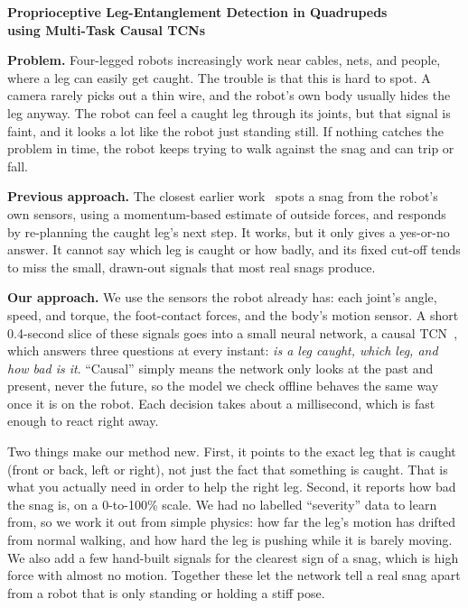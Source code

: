 \documentclass[11pt]{article}
\begin{document}
\begin{center}
  {\Large\bfseries Proprioceptive Leg-Entanglement Detection in Quadrupeds\\[2pt]
   using Multi-Task Causal TCNs}
\end{center}

\vspace{4pt}

\noindent\textbf{Problem.} Four-legged robots increasingly work near cables, nets, and people, where a
leg can easily get caught. The trouble is that this is hard to spot. A camera rarely picks out a thin
wire, and the robot's own body usually hides the leg anyway. The robot can feel a caught leg through
its joints, but that signal is faint, and it looks a lot like the robot just standing still. If nothing
catches the problem in time, the robot keeps trying to walk against the snag and can trip or fall.

\noindent\textbf{Previous approach.} The closest earlier work~\cite{yim2023} spots a snag from the
robot's own sensors, using a momentum-based estimate of outside forces, and responds by re-planning the
caught leg's next step. It works, but it only gives a yes-or-no answer. It cannot say which leg is
caught or how badly, and its fixed cut-off tends to miss the small, drawn-out signals that most real
snags produce.

\noindent\textbf{Our approach.} We use the sensors the robot already has: each joint's angle, speed,
and torque, the foot-contact forces, and the body's motion sensor. A short 0.4-second slice of these
signals goes into a small neural network, a causal TCN~\cite{bai2018,oord2016}, which answers three
questions at every instant: \emph{is a leg caught, which leg, and how bad is it}. ``Causal'' simply
means the network only looks at the past and present, never the future, so the model we check offline
behaves the same way once it is on the robot. Each decision takes about a millisecond, which is fast
enough to react right away.

Two things make our method new. First, it points to the exact leg that is caught (front or back, left
or right), not just the fact that something is caught. That is what you actually need in order to help
the right leg. Second, it reports how bad the snag is, on a 0-to-100\% scale. We had no labelled
``severity'' data to learn from, so we work it out from simple physics: how far the leg's motion has
drifted from normal walking, and how hard the leg is pushing while it is barely moving. We also add a
few hand-built signals for the clearest sign of a snag, which is high force with almost no motion.
Together these let the network tell a real snag apart from a robot that is only standing or holding a
stiff pose.
\end{document}
